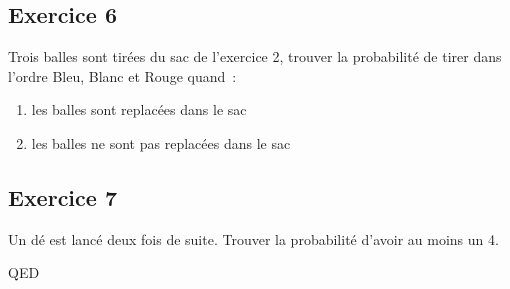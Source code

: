 \documentclass[]{book}
\theoremstyle{definition}
\begin{document}
\subsection*{Exercice 6}
Trois balles sont tir\'ees du sac de l'exercice 2, trouver la probabilit\'e de tirer dans l'ordre Bleu, Blanc et Rouge quand\ : 
\begin{enumerate}
\item les balles sont replac\'ees dans le sac
\item les balles ne sont pas replac\'ees dans le sac
\end{enumerate}

\subsection*{Exercice 7}
Un d\'e est lanc\'e deux fois de suite. Trouver la probabilit\'e d'avoir au moins un 4.


QED
\end{document}
